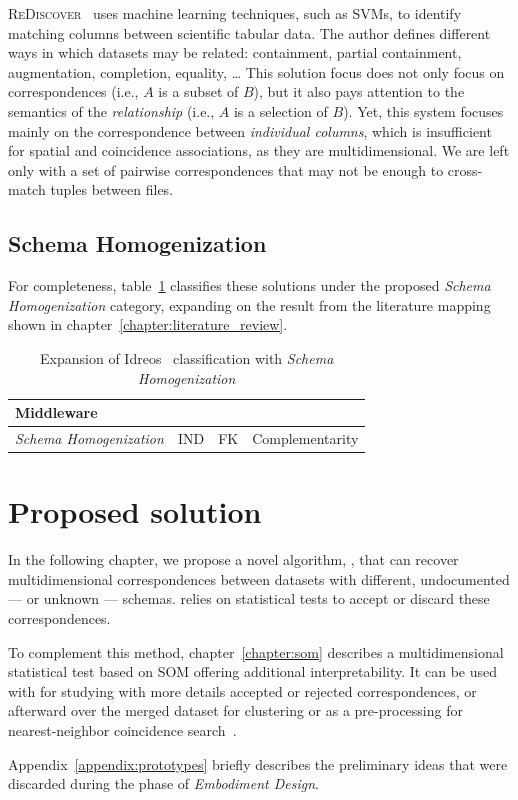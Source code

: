 \textsc{ReDiscover}~\cite{alawini2016} uses machine learning techniques, such as
\glspl{SVM}, to identify matching columns between scientific tabular data.
The author defines different ways in which datasets may be related:
containment, partial containment, augmentation, completion, equality, \ldots
This solution focus does not only focus on correspondences (i.e., $A$ is a subset of $B$),
but it also pays attention to the semantics of the \emph{relationship} (i.e., $A$
is a selection of $B$).
Yet, this system focuses mainly on the correspondence between \emph{individual columns},
which is insufficient for spatial and coincidence associations, as they are multidimensional.
We are left only with a set of pairwise correspondences that may not be enough to cross-match
tuples between files.

\subsection{Schema Homogenization}

For completeness, table~\ref{tab:missing_middleware} classifies these solutions
under the proposed \emph{Schema Homogenization} category,
expanding on the result from the literature mapping shown in chapter~\ref{chapter:literature_review}.

\begin{table}[ht]
    \centering
    \begin{tabularx}{\linewidth}{p{7em} >{\raggedright}X >{\raggedright}X X}
    \hline
    \multicolumn{4}{l}{\textbf{Middleware}} \\
    \hline
    \textit{Schema \mbox{Homogenization}} &
    \gls{IND}     \cite{DeMarchi2002,DeMarchi2003zigzag,koeller2002integration} &
    \gls{FK}      \cite{Rostin2009,Zhang2010,jiang_holistic_2020} &
    Complementarity \cite{alawini2016} \\
    \hline
    \end{tabularx}
    \caption[Articles under Schema Homogenization]{
    Expansion of Idreos~\cite{Idreos2015} classification with \emph{Schema Homogenization}}
    \label{tab:missing_middleware}
\end{table}


\section{Proposed solution}
\label{sec:gaps/proposed}
In the following chapter, we propose a novel algorithm, \PresQ, that
can recover multidimensional correspondences between datasets with different,
undocumented --- or unknown --- schemas. \PresQ relies on statistical tests to
accept or discard these correspondences.

To complement this method, chapter~\ref{chapter:som} describes a multidimensional
statistical test based on \gls{SOM} offering additional interpretability. It can be
used with \PresQ for studying with more details accepted or rejected correspondences,
or afterward over the merged dataset for clustering or as a pre-processing for nearest-neighbor
coincidence search~\cite{silva2011som}.

Appendix~\ref{appendix:prototypes} briefly describes the preliminary ideas that were
discarded during the phase of \emph{Embodiment Design}.
